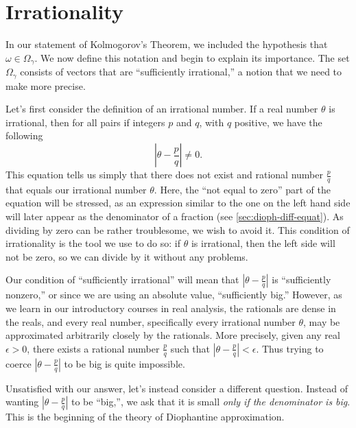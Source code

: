 \documentclass[twoside,letterpaper,10pt]{article}
\begin{document}

\section{Irrationality}
\label{sec:irrationality}

In our statement of Kolmogorov's Theorem, we included the hypothesis that
$\omega \in \Omega_{\gamma}$.
We now define this notation and begin to explain its importance.
The set $\Omega_{\gamma}$ consists of vectors that are ``sufficiently
irrational,'' a notion that we need to make more precise.

Let's first consider the definition of an irrational number.
If a real number $\theta$ is irrational, then for all pairs if integers $p$ and
$q$, with $q$ positive, we have the following
\begin{equation*}
  \left| \theta - \frac{p}{q} \right| \neq 0.
\end{equation*}
This equation tells us simply that there does not exist and rational number
$\frac{p}{q}$ that equals our irrational number $\theta$.
Here, the ``not equal to zero'' part of the equation will be stressed, as an
expression similar to the one on the left hand side will later appear as the
denominator of a fraction (see \cref{sec:dioph-diff-equat}).
As dividing by zero can be rather troublesome, we wish to avoid it.
This condition of irrationality is the tool we use to do so: if $\theta$ is
irrational, then the left side will not be zero, so we can divide by it without
any problems.

Our condition of ``sufficiently irrational'' will mean that $\left| \theta -
  \frac{p}{q} \right|$ is ``sufficiently nonzero,'' or since we are using an
absolute value, ``sufficiently big.''
However, as we learn in our introductory courses in real analysis, the rationals
are dense in the reals, and every real number, specifically every irrational
number $\theta$, may be approximated arbitrarily closely by the rationals.
More precisely, given any real $\epsilon > 0$, there exists a rational number
$\frac{p}{q}$ such that $\left| \theta - \frac{p}{q} \right| < \epsilon$.
Thus trying to coerce $\left| \theta - \frac{p}{q} \right|$ to be big is quite
impossible.

Unsatisfied with our answer, let's instead consider a different question.
Instead of wanting $\left| \theta - \frac{p}{q} \right|$ to be ``big,'', we ask
that it is small \emph{only if the denominator is big}.
This is the beginning of the theory of Diophantine approximation.
\end{document}
